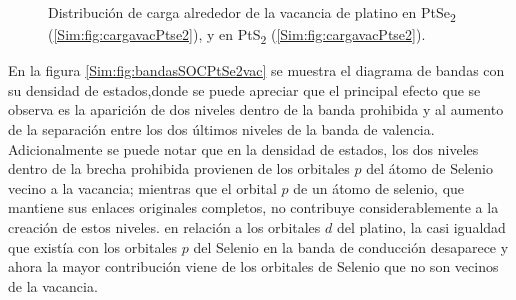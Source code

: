 \begin{figure}[!hbt]
	\centering
  \caption[Distribuci\'on de carga en alrededor de la vacancia de platino en PtSe\textsubscript{2} y PtSe\textsubscript{2}.]{Distribuci\'on de carga alrededor de la vacancia de platino en PtSe\textsubscript{2} (\ref{Sim:fig:cargavacPtse2}), y en PtS\textsubscript{2} (\ref{Sim:fig:cargavacPtse2}).}
 \label{Sim:fig:cargavac}	
\end{figure}
En la figura \ref{Sim:fig:bandasSOCPtSe2vac} se muestra el diagrama de bandas con su densidad de estados,donde  se puede apreciar que el principal efecto que se observa es la aparici\'on de  dos niveles dentro de la banda prohibida y al aumento de la separaci\'on entre los dos \'ultimos niveles de la banda de valencia. Adicionalmente se puede notar que en la densidad de estados, los dos niveles dentro de la brecha prohibida provienen de los orbitales $p$ del \'atomo de Selenio vecino a la vacancia; mientras que el orbital $p$ de un \'atomo de selenio, que mantiene sus enlaces originales completos, no contribuye considerablemente a la creación de estos niveles. en relaci\'on a los orbitales $d$ del platino,  la casi igualdad que exist\'ia con los orbitales $p$ del Selenio en la banda de conducci\'on desaparece y ahora la mayor contribuci\'on viene de los orbitales de Selenio que no son vecinos de la vacancia.

